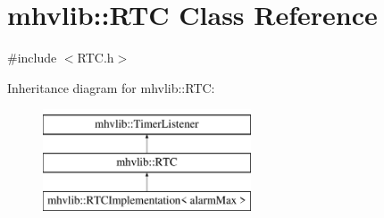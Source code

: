 \hypertarget{classmhvlib_1_1_r_t_c}{\section{mhvlib\-:\-:R\-T\-C Class Reference}
\label{classmhvlib_1_1_r_t_c}
}


{\ttfamily \#include $<$R\-T\-C.\-h$>$}

Inheritance diagram for mhvlib\-:\-:R\-T\-C\-:\begin{figure}[H]
\begin{center}
\leavevmode
\includegraphics[height=3.000000cm]{classmhvlib_1_1_r_t_c}
\end{center}
\end{figure}
